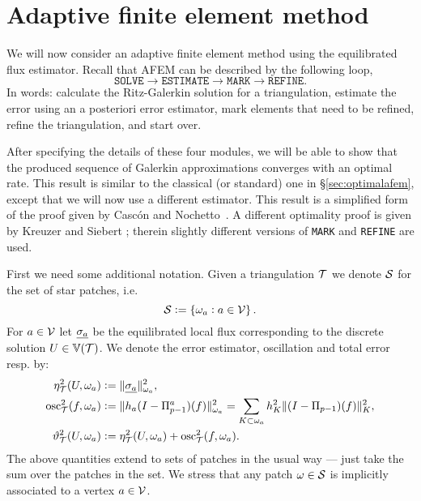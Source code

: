 \documentclass[thesis.tex]{subfiles}
\begin{document}
\section{Adaptive finite element method}
\label{sec:afemequil}
We will now consider an adaptive finite element method using the equilibrated flux estimator.
Recall that AFEM can be described by the following loop,
\[
  \texttt{SOLVE} \to \texttt{ESTIMATE} \to \texttt{MARK} \to \texttt{REFINE}.
\]
In words: calculate the Ritz-Galerkin solution for a triangulation, estimate
the error using an a posteriori error estimator, mark elements that need to be refined, refine
the triangulation, and start over. 

After specifying the details of these four modules, we will be able to show that the produced
sequence of Galerkin approximations converges with an optimal rate. This result
is similar to the classical (or standard) one in \S\ref{sec:optimalafem}, except that we will now use a different estimator. This
result is a simplified form of the proof given by Casc\'on and Nochetto~\cite{cascon2012}.
A different optimality proof is given by Kreuzer and Siebert \cite{kreuzersiebert}; therein
slightly different versions of \texttt{MARK} and \texttt{REFINE} are used.

First we need some additional notation. Given a triangulation $\mathcal{T}$ we denote $\mathcal{S}$ for the set of star patches, i.e. 
\[
  \mathcal{S} := \set{\omega_a : a \in \mathcal{V}}.
\]
For $a \in \mathcal{V}$ let $\underline{\sigma_a}$ be the equilibrated local flux corresponding to the discrete solution $U \in \mathbb{V}(\mathcal{T})$. We denote the
  error estimator, oscillation and total error resp. by:
\begin{align*}
  \eta^2_{\mathcal{T}}(U, \omega_a) &:= \| \underline{\sigma_a} \|^2_{\omega_a}, \\
  \operatorname{osc}^2_{\mathcal{T}}(f, \omega_a) &:= \| h_a(I - \Pi_{p-1}^a)(f) \|_{\omega_a}^2 = \sum_{K \subset \omega_a} h_K^2 \| (I - \Pi_{p-1})(f) \|^2_K,\\
  \vartheta^2_{\mathcal{T}}(U, \omega_a) &:= \eta^2_{\mathcal{T}}(U, \omega_a) + \operatorname{osc}^2_{\mathcal{T}}(f, \omega_a).
\end{align*}
The above quantities extend to sets of patches in the usual way 
--- just take the sum over the patches in the set.
We stress that any patch $\omega \in \mathcal{S}$ is implicitly associated to a vertex $a \in \mathcal{V}$.
\end{document}
